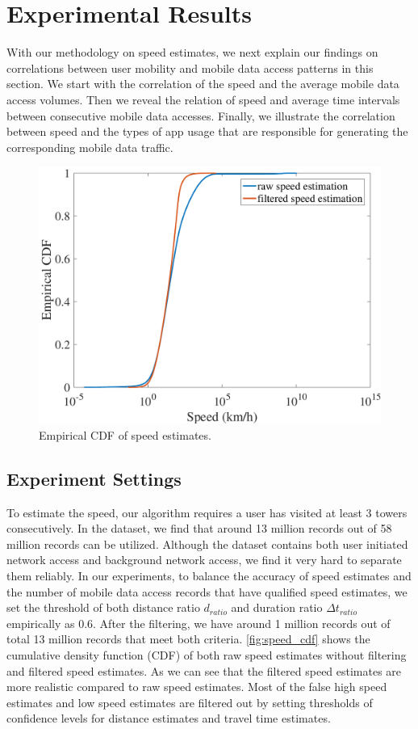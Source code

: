 \section{Experimental Results}\label{experiments}

With our methodology on speed estimates, we next explain our findings on correlations between user mobility and mobile data access patterns in this section. We start with the correlation of the speed and the average mobile data access volumes. Then we reveal the relation of speed and average time intervals between consecutive mobile data accesses. Finally, we illustrate the correlation between speed and the types of app usage that are responsible for generating the corresponding mobile data traffic.

\begin{figure}[h]
    \centering
    \includegraphics[width=0.5\linewidth]{./figures/speed_cdf.pdf}
    \caption{Empirical CDF of speed estimates.}
    \label{fig:speed_cdf}
\end{figure}

\subsection{Experiment Settings}

To estimate the speed, our algorithm requires a user has visited at least 3 towers consecutively. In the dataset, we find that around 13 million records out of 58 million records can be utilized. Although the dataset contains both user initiated network access and background network access, we find it very hard to separate them reliably. In our experiments, to balance the accuracy of speed estimates and the number of mobile data access records that have qualified speed estimates, we set the threshold of both distance ratio $d_{ratio}$ and duration ratio $\Delta t_{ratio}$ empirically as 0.6. After the filtering, we have around 1 million records out of total 13 million records that meet both criteria. \autoref{fig:speed_cdf} shows the cumulative density function (CDF) of both raw speed estimates without filtering and filtered speed estimates. As we can see that the filtered speed estimates are more realistic compared to raw speed estimates. Most of the false high speed estimates and low speed estimates are filtered out by setting thresholds of confidence levels for distance estimates and travel time estimates.

